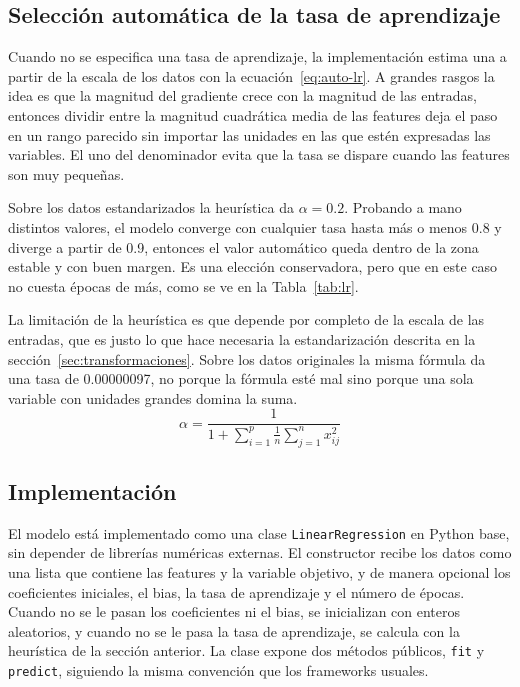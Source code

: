\documentclass[conference]{IEEEtran}
\begin{document}
\subsection{Selección automática de la tasa de aprendizaje}
Cuando no se especifica una tasa de aprendizaje, la implementación estima una a partir de la escala de los datos con la ecuación~\ref{eq:auto-lr}. A grandes rasgos la idea es que la magnitud del gradiente crece con la magnitud de las entradas, entonces dividir entre la magnitud cuadrática media de las features deja el paso en un rango parecido sin importar las unidades en las que estén expresadas las variables. El uno del denominador evita que la tasa se dispare cuando las features son muy pequeñas.

Sobre los datos estandarizados la heurística da $\alpha = 0.2$. Probando a mano distintos valores, el modelo converge con cualquier tasa hasta más o menos 0.8 y diverge a partir de 0.9, entonces el valor automático queda dentro de la zona estable y con buen margen. Es una elección conservadora, pero que en este caso no cuesta épocas de más, como se ve en la Tabla~\ref{tab:lr}.

La limitación de la heurística es que depende por completo de la escala de las entradas, que es justo lo que hace necesaria la estandarización descrita en la sección~\ref{sec:transformaciones}. Sobre los datos originales la misma fórmula da una tasa de 0.00000097, no porque la fórmula esté mal sino porque una sola variable con unidades grandes domina la suma.
\begin{equation}
\alpha = \frac{1}{1 + \sum_{i=1}^{p} \frac{1}{n}\sum_{j=1}^{n} x_{ij}^2}
\label{eq:auto-lr}
\end{equation}

\subsection{Implementación}
El modelo está implementado como una clase \texttt{LinearRegression} en Python base, sin depender de librerías numéricas externas. El constructor recibe los datos como una lista que contiene las features y la variable objetivo, y de manera opcional los coeficientes iniciales, el bias, la tasa de aprendizaje y el número de épocas. Cuando no se le pasan los coeficientes ni el bias, se inicializan con enteros aleatorios, y cuando no se le pasa la tasa de aprendizaje, se calcula con la heurística de la sección anterior. La clase expone dos métodos públicos, \texttt{fit} y \texttt{predict}, siguiendo la misma convención que los frameworks usuales.
\end{document}
